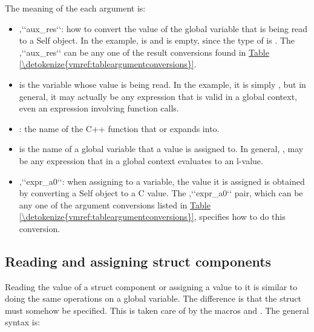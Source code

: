 \documentclass[letterpaper,10pt,english]{sphinxmanual}
\begin{document}
The meaning of the each argument is:
\begin{itemize}
\item {} 
,{}`{}`aux\_res{}`{}`: how to convert the value of the global variable that is being read to a Self object. In the  example,  is  and  is empty, since the type of  is . The ,{}`{}`aux\_res{}`{}` can be any one of the result conversions found in \hyperref[\detokenize{vmref:tableargumentconversions}]{Table \ref{\detokenize{vmref:tableargumentconversions}}}.

\item {} 
 is the variable whose value is being read. In the  example, it is simply , but in general, it may actually be any expression that is valid in a global context, even an expression involving function calls.

\item {} 
: the name of the C++ function that  or  expands into.

\item {} 
 is the name of a global variable that a value is assigned to. In general, , may be any expression that in a global context evaluates to an l-value.

\item {} 
,{}`{}`expr\_a0{}`{}`: when assigning to a variable, the value it is assigned is obtained by converting a Self object to a C value. The ,{}`{}`expr\_a0{}`{}` pair, which can be any one of the argument conversions listed in \hyperref[\detokenize{vmref:tableargumentconversions}]{Table \ref{\detokenize{vmref:tableargumentconversions}}}, specifies how to do this conversion.

\end{itemize}


\subsection{Reading and assigning struct components}
\label{\detokenize{vmref:index-76}}\label{\detokenize{vmref:reading-and-assigning-struct-components}}
Reading the value of a struct component or assigning a value to it is similar to doing the same operations
on a global variable. The difference is that the struct must somehow be specified. This is
taken care of by the macros  and . The general syntax is:
\end{document}
